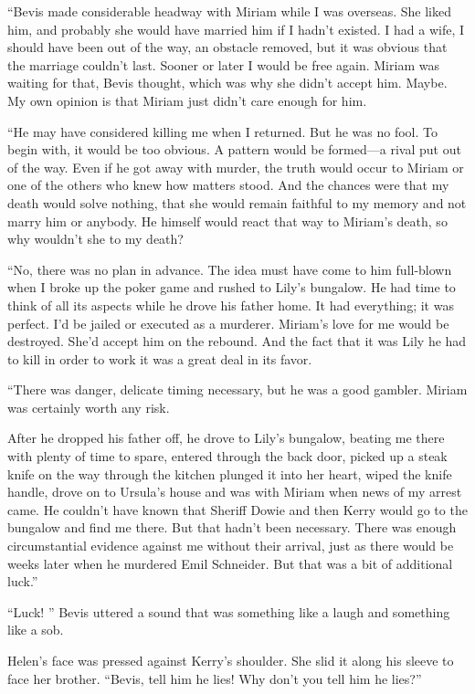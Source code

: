 \documentclass{novel}
\begin{document}
{“Bevis made considerable headway with Miriam while I was overseas. She liked him, and probably she would have married him if I hadn’t existed. I had a wife, I should have been out of the way, an obstacle removed, but it was obvious that the marriage couldn’t last. Sooner or later I would be free again. Miriam was waiting for that, Bevis thought, which was why she didn’t accept him. Maybe. My own opinion is that Miriam just didn’t care enough for him.

“He may have considered killing me when I returned. But he was no fool. To begin with, it would be too obvious. A pattern would be formed—a rival put out of the way. Even if he got away with murder, the truth would occur to Miriam or one of the others who knew how matters stood. And the chances were that my death would solve nothing, that she would remain faithful to my memory and not marry him or anybody. He himself would react that way to Miriam’s death, so why wouldn’t she to my death?

“No, there was no plan in advance. The idea must have come to him full-blown when I broke up the poker game and rushed to Lily’s bungalow. He had time to think of all its aspects while he drove his father home. It had everything; it was perfect. I’d be jailed or executed as a murderer. Miriam’s love for me would be destroyed. She’d accept him on the rebound. And the fact that it was Lily he had to kill in order to work it was a great deal in its favor.

“There was danger, delicate timing necessary, but he was a good gambler. Miriam was certainly worth any risk.

After he dropped his father off, he drove to Lily’s bungalow, beating me there with plenty of time to spare, entered through the back door, picked up a steak knife on the way through the kitchen plunged it into her heart, wiped the knife handle, drove on to Ursula’s house and was with Miriam when news of my arrest came. He couldn’t have known that Sheriff Dowie and then Kerry would go to the bungalow and find me there. But that hadn’t been necessary. There was enough circumstantial evidence against me without their arrival, just as there would be weeks later when he murdered Emil Schneider. But that was a bit of additional luck.”

“Luck! ” Bevis uttered a sound that was something like a laugh and something like a sob.

Helen’s face was pressed against Kerry’s shoulder. She slid it along his sleeve to face her brother. “Bevis, tell him he lies! Why don’t you tell him he lies?”

}
\end{document}
